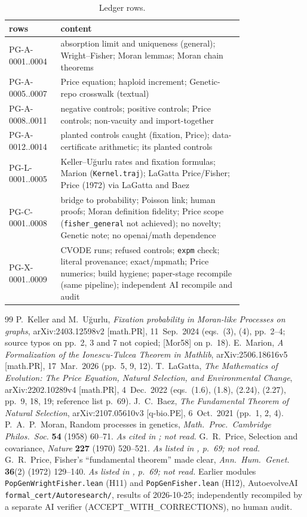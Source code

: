 \documentclass[11pt]{article}
\theoremstyle{remark}
\begin{document}
\begin{table}[ht]\centering\scriptsize
\begin{tabular}{lp{0.78\linewidth}}
\toprule
rows & content\\
\midrule
PG-A-0001..0004 & absorption limit and uniqueness (general); Wright--Fisher; Moran lemmas; Moran chain theorems\\
PG-A-0005..0007 & Price equation; haploid increment; Genetic-repo crosswalk (textual)\\
PG-A-0008..0011 & negative controls; positive controls; Price controls; non-vacuity and import-together\\
PG-A-0012..0014 & planted controls caught (fixation, Price); data-certificate arithmetic; its planted controls\\
PG-L-0001..0005 & Keller--U\u{g}urlu rates and fixation formulas; Marion (\texttt{Kernel.traj}); LaGatta Price/Fisher; Price (1972) via LaGatta and Baez\\
PG-C-0001..0008 & bridge to probability; Poisson link; human proofs; Moran definition fidelity; Price scope (\texttt{fisher\_general} not achieved); no novelty; Genetic note; no openai/math dependence\\
PG-X-0001..0009 & CVODE runs; refused controls; \texttt{expm} check; literal provenance; exact/mpmath; Price numerics; build hygiene; paper-stage recompile (same pipeline); independent AI recompile and audit\\
\bottomrule
\end{tabular}
\caption{Ledger rows.}\label{tab:ledger}
\end{table}

\begin{thebibliography}{99}\small
{} P.~Keller and M.~U\u{g}urlu, \emph{Fixation probability in Moran-like Processes on graphs}, arXiv:2403.12598v2 [math.PR], 11~Sep.\ 2024 (eqs.\ (3), (4), pp.\ 2--4;
 source typos on pp.\ 2, 3 and 7 not copied; [Mor58] on p.~18).
 E.~Marion, \emph{A Formalization of the Ionescu-Tulcea Theorem in Mathlib}, arXiv:2506.18616v5 [math.PR], 17~Mar.\ 2026 (pp.\ 5, 9, 12).
 T.~LaGatta, \emph{The Mathematics of Evolution: The Price Equation, Natural Selection, and Environmental Change}, arXiv:2202.10289v4 [math.PR], 4~Dec.\ 2022
 (eqs.\ (1.6), (1.8), (2.24), (2.27), pp.\ 9, 18, 19; reference list p.~69).
 J.~C.~Baez, \emph{The Fundamental Theorem of Natural Selection}, arXiv:2107.05610v3 [q-bio.PE], 6~Oct.\ 2021 (pp.\ 1, 2, 4).
 P.~A.~P.~Moran, Random processes in genetics, \emph{Math.\ Proc.\ Cambridge Philos.\ Soc.} \textbf{54} (1958) 60--71. \emph{As cited in \cite{KU}; not read.}
 G.~R.~Price, Selection and covariance, \emph{Nature} \textbf{227} (1970) 520--521. \emph{As listed in \cite{LaG}, p.~69; not read.}
 G.~R.~Price, Fisher's ``fundamental theorem'' made clear, \emph{Ann.\ Hum.\ Genet.} \textbf{36}(2) (1972) 129--140. \emph{As listed in \cite{LaG}, p.~69; not read.}
 Earlier modules \texttt{PopGenWrightFisher.lean} (H11) and \texttt{PopGenFisher.lean} (H12), AutoevolveAI \texttt{formal\_cert/Autoresearch/}, results of 2026-10-25;
 independently recompiled by a separate AI verifier (ACCEPT\_WITH\_CORRECTIONS), no human audit.
\end{thebibliography}
\end{document}
